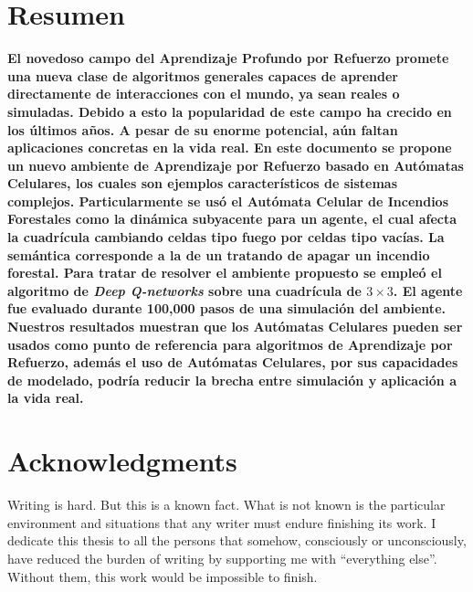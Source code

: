 \documentclass[
  12pt,
  openany]{book}
\begin{document}
\hypertarget{resumen}{%
\chapter*{Resumen}\label{resumen}}

\textbf{\large{El novedoso campo del Aprendizaje Profundo por Refuerzo promete una nueva clase de algoritmos generales capaces de aprender directamente de interacciones con el mundo, ya sean reales o simuladas. Debido a esto la popularidad de este campo ha crecido en los últimos años. A pesar de su enorme potencial, aún faltan aplicaciones concretas en la vida real. En este documento se propone un nuevo ambiente de Aprendizaje por Refuerzo basado en Autómatas Celulares, los cuales son ejemplos característicos de sistemas complejos. Particularmente se usó el Autómata Celular de Incendios Forestales como la dinámica subyacente para un agente, el cual afecta la cuadrícula cambiando celdas tipo fuego por celdas tipo vacías. La semántica corresponde a la de un  tratando de apagar un incendio forestal. Para tratar de resolver el ambiente propuesto se empleó el algoritmo de \emph{Deep Q-networks} sobre una cuadrícula de $3 \times 3$. El agente fue evaluado durante 100,000 pasos de una simulación del ambiente. Nuestros resultados muestran que los Autómatas Celulares pueden ser usados como punto de referencia para algoritmos de Aprendizaje por Refuerzo, además el uso de Autómatas Celulares, por sus capacidades de modelado, podría reducir la brecha entre simulación y aplicación a la vida real.}}

\hypertarget{acknowledgments}{%
\chapter*{Acknowledgments}\label{acknowledgments}}

Writing is hard. But this is a known fact. What is not known is the particular environment and situations that any writer must endure finishing its work. I dedicate this thesis to all the persons that somehow, consciously or unconsciously, have reduced the burden of writing by supporting me with ``everything else''. Without them, this work would be impossible to finish.
\end{document}
